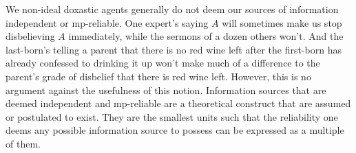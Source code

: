 We non-ideal doxastic agents generally do not deem our sources of information independent or mp-reliable. One expert's saying $A$ will sometimes make us stop disbelieving $A$ immediately, while the sermons of a dozen others won't. And the last-born's telling a parent that there is no red wine left after the first-born has already confessed to drinking it up won't make much of a difference to the parent's grade of disbelief that there is red wine left. However, this is no argument against the usefulness of this notion. Information sources that are deemed independent and mp-reliable are a theoretical construct that are assumed or postulated to exist. They are the smallest units such that the reliability one deems any possible information source to possess can be expressed as a multiple of them.




